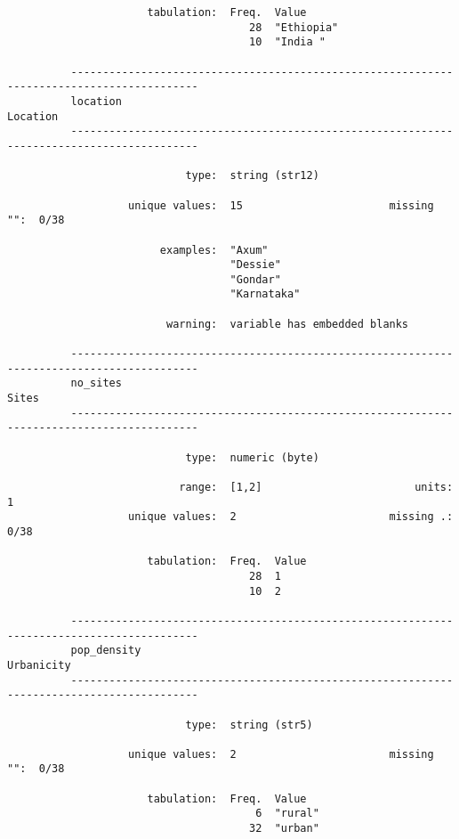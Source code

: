 \documentclass{article}
\begin{document}
\begin{verbatim}
                      tabulation:  Freq.  Value
                                      28  "Ethiopia"
                                      10  "India "
          
          ------------------------------------------------------------------------------------------
          location                                                                          Location
          ------------------------------------------------------------------------------------------
          
                            type:  string (str12)
          
                   unique values:  15                       missing "":  0/38
          
                        examples:  "Axum"
                                   "Dessie"
                                   "Gondar"
                                   "Karnataka"
          
                         warning:  variable has embedded blanks
          
          ------------------------------------------------------------------------------------------
          no_sites                                                                             Sites
          ------------------------------------------------------------------------------------------
          
                            type:  numeric (byte)
          
                           range:  [1,2]                        units:  1
                   unique values:  2                        missing .:  0/38
          
                      tabulation:  Freq.  Value
                                      28  1
                                      10  2
          
          ------------------------------------------------------------------------------------------
          pop_density                                                                     Urbanicity
          ------------------------------------------------------------------------------------------
          
                            type:  string (str5)
          
                   unique values:  2                        missing "":  0/38
          
                      tabulation:  Freq.  Value
                                       6  "rural"
                                      32  "urban"
          

\end{verbatim}
\end{document}
